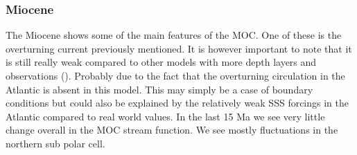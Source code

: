 \subsubsection{Miocene}

The Miocene shows some of the main features of the MOC. One of these is the overturning current previously mentioned. It is however important to note that it is still really weak compared to other models with more depth layers and observations (\cite{von2006effect}). Probably due to the fact that the overturning circulation in the Atlantic is absent in this model. This may simply be a case of boundary conditions but could also be explained by the relatively weak SSS forcings in the Atlantic compared to real world values. In the last 15 Ma we see very little change overall in the MOC stream function. We see mostly fluctuations in the northern sub polar cell. 